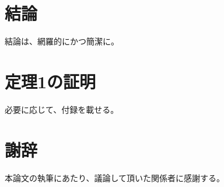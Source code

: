 \documentclass[80pt,oneside,openany,report]{jsbook}
\begin{document}

\chapter{結論}
結論は、網羅的にかつ簡潔に。


\appendix
\chapter{定理1の証明}
必要に応じて、付録を載せる。


\backmatter
\chapter{謝辞}
本論文の執筆にあたり、議論して頂いた関係者に感謝する。




\end{document}
